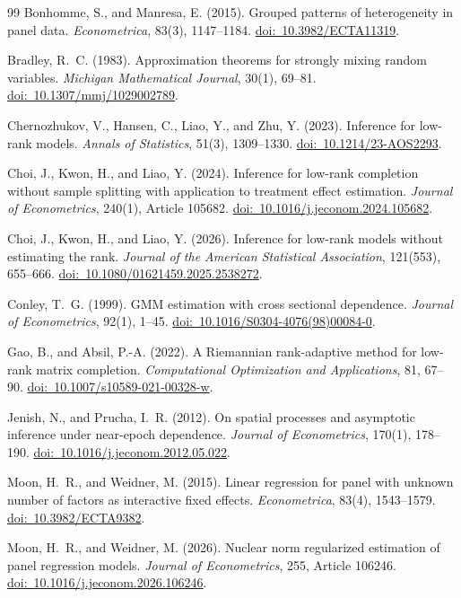 \documentclass[11pt]{article}
\numberwithin{equation}{section}
\theoremstyle{remark}
\newcommand{\doilink}[1]{\href{https://doi.org/#1}{doi:\ #1}}
\begin{document}
\begin{singlespace}
\begin{thebibliography}{99}
Bonhomme, S., and Manresa, E. (2015).
Grouped patterns of heterogeneity in panel data.
\emph{Econometrica}, 83(3), 1147--1184.
\doilink{10.3982/ECTA11319}.

Bradley, R.~C. (1983).
Approximation theorems for strongly mixing random variables.
\emph{Michigan Mathematical Journal}, 30(1), 69--81.
\doilink{10.1307/mmj/1029002789}.

Chernozhukov, V., Hansen, C., Liao, Y., and Zhu, Y. (2023).
Inference for low-rank models.
\emph{Annals of Statistics}, 51(3), 1309--1330.
\doilink{10.1214/23-AOS2293}.

Choi, J., Kwon, H., and Liao, Y. (2024).
Inference for low-rank completion without sample splitting with application to treatment effect estimation.
\emph{Journal of Econometrics}, 240(1), Article 105682.
\doilink{10.1016/j.jeconom.2024.105682}.

Choi, J., Kwon, H., and Liao, Y. (2026).
Inference for low-rank models without estimating the rank.
\emph{Journal of the American Statistical Association}, 121(553), 655--666.
\doilink{10.1080/01621459.2025.2538272}.

Conley, T.~G. (1999).
GMM estimation with cross sectional dependence.
\emph{Journal of Econometrics}, 92(1), 1--45.
\doilink{10.1016/S0304-4076(98)00084-0}.


Gao, B., and Absil, P.-A. (2022).
A Riemannian rank-adaptive method for low-rank matrix completion.
\emph{Computational Optimization and Applications}, 81, 67--90.
\doilink{10.1007/s10589-021-00328-w}.

Jenish, N., and Prucha, I.~R. (2012).
On spatial processes and asymptotic inference under near-epoch dependence.
\emph{Journal of Econometrics}, 170(1), 178--190.
\doilink{10.1016/j.jeconom.2012.05.022}.

Moon, H.~R., and Weidner, M. (2015).
Linear regression for panel with unknown number of factors as interactive fixed effects.
\emph{Econometrica}, 83(4), 1543--1579.
\doilink{10.3982/ECTA9382}.


Moon, H.~R., and Weidner, M. (2026).
Nuclear norm regularized estimation of panel regression models.
\emph{Journal of Econometrics}, 255, Article 106246.
\doilink{10.1016/j.jeconom.2026.106246}.


\end{thebibliography}
\end{singlespace}
\end{document}
